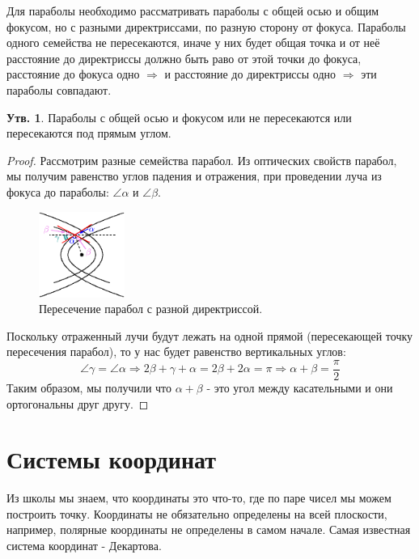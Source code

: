 \documentclass[12pt]{article}
\theoremstyle{definition}
\newtheorem{prop}{Утв.}
\begin{document}
Для параболы необходимо рассматривать параболы с общей осью и общим фокусом, но с разными директриссами, по разную сторону от фокуса. Параболы одного семейства не пересекаются, иначе у них будет общая точка и от неё расстояние до директриссы должно быть раво от этой точки  до фокуса, расстояние до фокуса одно $\Rightarrow$ и расстояние до директриссы одно $\Rightarrow$ эти параболы совпадают.
\begin{prop}
	Параболы с общей осью и фокусом или не пересекаются или пересекаются под прямым углом.
\end{prop}
\begin{proof}
	Рассмотрим разные семейства парабол. Из оптических свойств парабол, мы получим равенство углов падения и отражения, при проведении луча из фокуса до параболы: $\angle \alpha$ и $\angle \beta$.
	\begin{figure}[H]
		\centering
		\includegraphics[width=0.25\textwidth]{ANGL2_17.eps}
		\caption{Пересечение парабол с разной директриссой.}
		\label{2_17}
	\end{figure}
	Поскольку отраженный лучи будут лежать на одной прямой (пересекающей точку пересечения парабол), то у нас будет равенство вертикальных углов: 
	$$
		\angle \gamma = \angle \alpha \Rightarrow 2\beta + \gamma + \alpha = 2\beta + 2\alpha= \pi \Rightarrow \alpha + \beta = \dfrac{\pi}{2}
	$$
	Таким образом, мы получили что $\alpha + \beta$ - это угол между касательными и они ортогональны друг другу.
\end{proof}

\newpage
\section*{Системы координат}
Из школы мы знаем, что координаты это что-то, где по паре чисел мы можем построить точку. Координаты не обязательно определены на всей плоскости, например, полярные координаты не определены в самом начале. Самая известная система координат - Декартова. 
\end{document}
